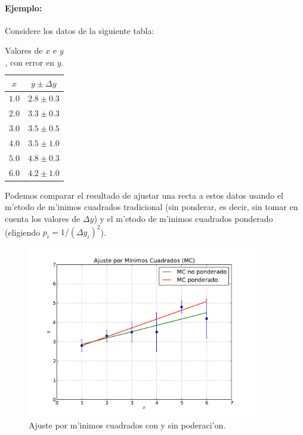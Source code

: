 \documentclass[letterpaper,11pt]{report}
\begin{document}
\paragraph{Ejemplo:} Considere los datos de la siguiente tabla:
\begin{table}[h!]
\begin{center}
\begin{tabular}{c|c}
$x$ & $y\pm\Delta y$ \\ \hline
$1.0$ & $2.8\pm 0.3$ \\ \hline 
$2.0$ & $3.3\pm 0.3$ \\ \hline
$3.0$ & $3.5\pm 0.5$ \\ \hline
$4.0$ & $3.5\pm 1.0$ \\ \hline
$5.0$ & $4.8\pm 0.3$\\ \hline
$6.0$ & $4.2\pm 1.0$ 
\end{tabular}
\caption{Valores de $x$ e $y$, con error en $y$.}
\label{tab-xyDy}
\end{center}
\end{table}
Podemos comparar el resultado de ajustar una recta a estos datos usando el m'etodo de m'inimos cuadrados tradicional (sin ponderar, es decir, sin tomar en cuenta los valores de $\Delta y$) y el m'etodo de m'inimos cuadrados ponderado (eligiendo $p_i=1/(\Delta y_{i})^2$).
\begin{figure}[h!]
\begin{center}
\includegraphics[width=10cm]{figs/fig-mc-ponderado.pdf}
\caption{Ajuste por m'inimos cuadrados con y sin poderaci'on.}
\end{center}
\end{figure}
\end{document}
